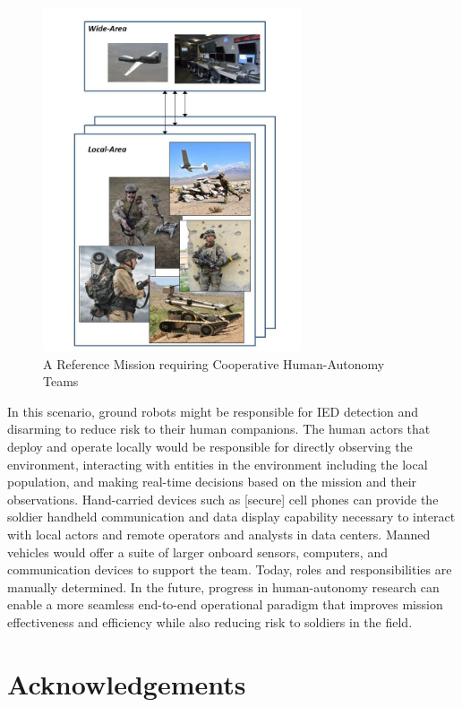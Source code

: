 \documentclass[11pt]{dssg}
\begin{document}
\begin{figure}[h]
   \centering
   \includegraphics[height=4in]{reference-mission.jpg} 
   \caption{A Reference Mission requiring Cooperative Human-Autonomy Teams}
   \label{fig:ref-mission}
\end{figure}

In this scenario, ground robots might be responsible for IED detection and disarming to reduce risk to
their human companions.  The human actors that deploy and operate locally would be responsible
for directly observing the environment, interacting with entities in the environment including the local population, and
making real-time decisions based on the mission and their observations.  Hand-carried devices such as [secure] cell phones
can provide the soldier handheld communication and data display capability necessary to interact with local actors and remote operators and analysts in data centers.  Manned vehicles would offer a suite of larger onboard sensors, computers, and communication devices to support the team.  Today, roles and responsibilities are manually determined.  In the future, progress in human-autonomy research can enable a more seamless end-to-end operational paradigm that improves mission effectiveness and efficiency while also reducing risk to soldiers in the field.  








\section*{Acknowledgements}
\end{document}
